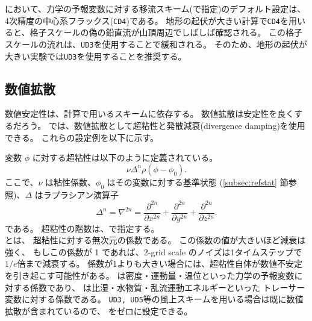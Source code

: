 \scalerm において、力学の予報変数に対する移流スキーム(で指定)のデフォルト設定は、
4次精度の中心系フラックス(\verb|CD4|)である。
地形の起伏が大きい計算で\verb|CD4|を用いると、格子スケールの偽の鉛直流が山頂周辺でしばしば確認される。
この格子スケールの流れは、\verb|UD3|を使用することで緩和される。
そのため、地形の起伏が大きい実験では\verb|UD3|を使用することを推奨する。

\subsection{数値拡散} \label{subsec:numdiff}

数値安定性は、計算で用いるスキームに依存する。
数値拡散は安定性を良くするだろう。
\scalerm では、数値拡散として超粘性と発散減衰(divergence damping)を使用できる。
これらの設定例を以下に示す。

変数 $\phi$ に対する超粘性は以下のように定義されている。
\begin{equation}
  \nu \Delta^n \rho ( \phi - \phi_0 ).
\end{equation}
ここで、$\nu$ は粘性係数、$\phi_0$ はその変数に対する基準状態 (\ref{subsec:refstat} 節参照)、$\Delta$ はラプラシアン演算子
\begin{equation}
  \Delta^n = \nabla^{2n} = \frac{\partial^{2n}}{\partial x^{2n}} + \frac{\partial^{2n}}{\partial y^{2n}} + \frac{\partial^{2n}}{\partial z^{2n}}.
\end{equation}
である。
超粘性の階数は、で指定する。\\
とは、
超粘性に対する無次元の係数である。
この係数の値が大きいほど減衰は強く、
もしこの係数が 1 であれば、2-grid scale のノイズは1タイムステップで$1/e$倍まで減衰する。
係数が1よりも大きい場合には、超粘性自体が数値不安定を引き起こす可能性がある。
は密度・運動量・温位といった力学の予報変数に対する係数であり、
は比湿・水物質・乱流運動エネルギーといった
トレーサー変数に対する係数である。
\verb|UD3, UD5|等の風上スキームを用いる場合は既に数値拡散が含まれているので、
をゼロに設定できる。


